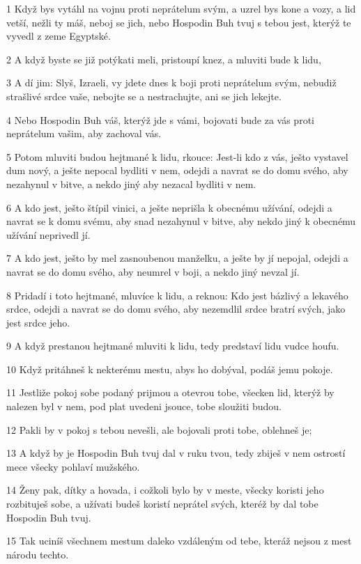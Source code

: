 \par 1 Když bys vytáhl na vojnu proti neprátelum svým, a uzrel bys kone a vozy, a lid vetší, nežli ty máš, neboj se jich, nebo Hospodin Buh tvuj s tebou jest, kterýž te vyvedl z zeme Egyptské.
\par 2 A když byste se již potýkati meli, pristoupí knez, a mluviti bude k lidu,
\par 3 A dí jim: Slyš, Izraeli, vy jdete dnes k boji proti neprátelum svým, nebudiž strašlivé srdce vaše, nebojte se a nestrachujte, ani se jich lekejte.
\par 4 Nebo Hospodin Buh váš, kterýž jde s vámi, bojovati bude za vás proti neprátelum vašim, aby zachoval vás.
\par 5 Potom mluviti budou hejtmané k lidu, rkouce: Jest-li kdo z vás, ješto vystavel dum nový, a ješte nepocal bydliti v nem, odejdi a navrat se do domu svého, aby nezahynul v bitve, a nekdo jiný aby nezacal bydliti v nem.
\par 6 A kdo jest, ješto štípil vinici, a ješte neprišla k obecnému užívání, odejdi a navrat se k domu svému, aby snad nezahynul v bitve, aby nekdo jiný k obecnému užívání neprivedl jí.
\par 7 A kdo jest, ješto by mel zasnoubenou manželku, a ješte by jí nepojal, odejdi a navrat se do domu svého, aby neumrel v boji, a nekdo jiný nevzal jí.
\par 8 Pridadí i toto hejtmané, mluvíce k lidu, a reknou: Kdo jest bázlivý a lekavého srdce, odejdi a navrat se do domu svého, aby nezemdlil srdce bratrí svých, jako jest srdce jeho.
\par 9 A když prestanou hejtmané mluviti k lidu, tedy predstaví lidu vudce houfu.
\par 10 Když pritáhneš k nekterému mestu, abys ho dobýval, podáš jemu pokoje.
\par 11 Jestliže pokoj sobe podaný prijmou a otevrou tobe, všecken lid, kterýž by nalezen byl v nem, pod plat uvedeni jsouce, tobe sloužiti budou.
\par 12 Pakli by v pokoj s tebou nevešli, ale bojovali proti tobe, oblehneš je;
\par 13 A když by je Hospodin Buh tvuj dal v ruku tvou, tedy zbiješ v nem ostrostí mece všecky pohlaví mužského.
\par 14 Ženy pak, dítky a hovada, i cožkoli bylo by v meste, všecky koristi jeho rozbituješ sobe, a užívati budeš koristí neprátel svých, kteréž by dal tobe Hospodin Buh tvuj.
\par 15 Tak uciníš všechnem mestum daleko vzdáleným od tebe, kteráž nejsou z mest národu techto.

